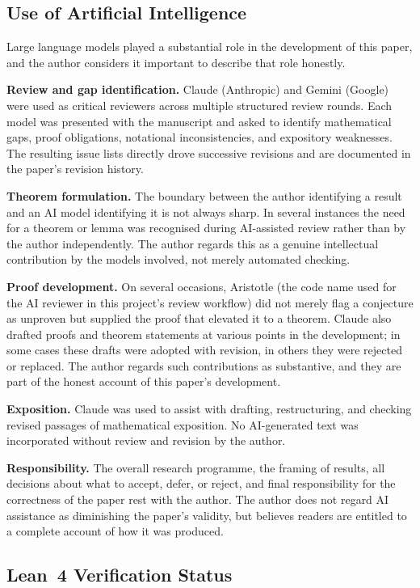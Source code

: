 \documentclass[12pt]{article}
\theoremstyle{definition}
\theoremstyle{remark}
\theoremstyle{plain}
\begin{document}
\subsection*{Use of Artificial Intelligence}

Large language models played a substantial role in the development of this paper,
and the author considers it important to describe that role honestly.

\textbf{Review and gap identification.}
Claude (Anthropic) and Gemini (Google) were used as critical reviewers across
multiple structured review rounds.
Each model was presented with the manuscript and asked to identify mathematical
gaps, proof obligations, notational inconsistencies, and expository weaknesses.
The resulting issue lists directly drove successive revisions and are documented
in the paper's revision history.

\textbf{Theorem formulation.}
The boundary between the author identifying a result and an AI model identifying
it is not always sharp.
In several instances the need for a theorem or lemma was recognised during
AI-assisted review rather than by the author independently.
The author regards this as a genuine intellectual contribution by the models
involved, not merely automated checking.

\textbf{Proof development.}
On several occasions, Aristotle (the code name used for the AI reviewer in
this project's review workflow) did not merely flag a conjecture as unproven
but supplied the proof that elevated it to a theorem.
Claude also drafted proofs and theorem statements at various points in the
development; in some cases these drafts were adopted with revision, in others
they were rejected or replaced.
The author regards such contributions as substantive, and they are part of
the honest account of this paper's development.

\textbf{Exposition.}
Claude was used to assist with drafting, restructuring, and checking revised
passages of mathematical exposition.
No AI-generated text was incorporated without review and revision by the author.

\textbf{Responsibility.}
The overall research programme, the framing of results, all decisions about
what to accept, defer, or reject, and final responsibility for the correctness
of the paper rest with the author.
The author does not regard AI assistance as diminishing the paper's validity,
but believes readers are entitled to a complete account of how it was produced.

\subsection*{Lean~4 Verification Status}
\end{document}
